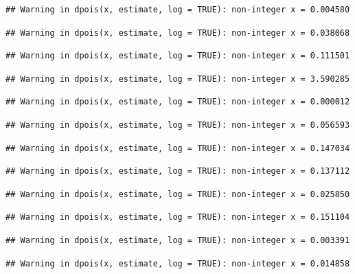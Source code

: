 \documentclass[]{article}
\begin{document}
\begin{verbatim}
## Warning in dpois(x, estimate, log = TRUE): non-integer x = 0.004580
\end{verbatim}

\begin{verbatim}
## Warning in dpois(x, estimate, log = TRUE): non-integer x = 0.038068
\end{verbatim}

\begin{verbatim}
## Warning in dpois(x, estimate, log = TRUE): non-integer x = 0.111501
\end{verbatim}

\begin{verbatim}
## Warning in dpois(x, estimate, log = TRUE): non-integer x = 3.590285
\end{verbatim}

\begin{verbatim}
## Warning in dpois(x, estimate, log = TRUE): non-integer x = 0.000012
\end{verbatim}

\begin{verbatim}
## Warning in dpois(x, estimate, log = TRUE): non-integer x = 0.056593
\end{verbatim}

\begin{verbatim}
## Warning in dpois(x, estimate, log = TRUE): non-integer x = 0.147034
\end{verbatim}

\begin{verbatim}
## Warning in dpois(x, estimate, log = TRUE): non-integer x = 0.137112
\end{verbatim}

\begin{verbatim}
## Warning in dpois(x, estimate, log = TRUE): non-integer x = 0.025850
\end{verbatim}

\begin{verbatim}
## Warning in dpois(x, estimate, log = TRUE): non-integer x = 0.151104
\end{verbatim}

\begin{verbatim}
## Warning in dpois(x, estimate, log = TRUE): non-integer x = 0.003391
\end{verbatim}

\begin{verbatim}
## Warning in dpois(x, estimate, log = TRUE): non-integer x = 0.014858
\end{verbatim}
\end{document}
